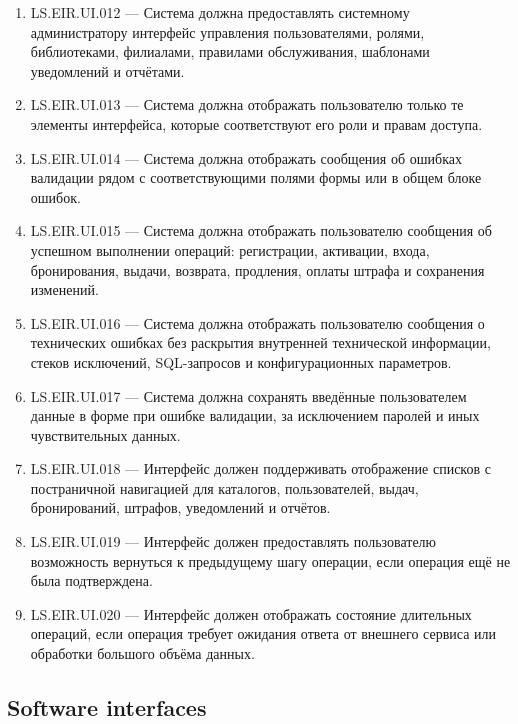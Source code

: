 \documentclass[12pt,a4paper]{article}
\begin{document}
\begin{enumerate}
		\item LS.EIR.UI.012 --- Система должна предоставлять системному администратору
		интерфейс управления пользователями, ролями, библиотеками, филиалами, правилами
		обслуживания, шаблонами уведомлений и отчётами.
		
		\item LS.EIR.UI.013 --- Система должна отображать пользователю только те элементы
		интерфейса, которые соответствуют его роли и правам доступа.
		
		\item LS.EIR.UI.014 --- Система должна отображать сообщения об ошибках валидации
		рядом с соответствующими полями формы или в общем блоке ошибок.
		
		\item LS.EIR.UI.015 --- Система должна отображать пользователю сообщения об
		успешном выполнении операций: регистрации, активации, входа, бронирования,
		выдачи, возврата, продления, оплаты штрафа и сохранения изменений.
		
		\item LS.EIR.UI.016 --- Система должна отображать пользователю сообщения о
		технических ошибках без раскрытия внутренней технической информации, стеков
		исключений, SQL-запросов и конфигурационных параметров.
		
		\item LS.EIR.UI.017 --- Система должна сохранять введённые пользователем данные
		в форме при ошибке валидации, за исключением паролей и иных чувствительных
		данных.
		
		\item LS.EIR.UI.018 --- Интерфейс должен поддерживать отображение списков
		с постраничной навигацией для каталогов, пользователей, выдач, бронирований,
		штрафов, уведомлений и отчётов.
		
		\item LS.EIR.UI.019 --- Интерфейс должен предоставлять пользователю возможность
		вернуться к предыдущему шагу операции, если операция ещё не была подтверждена.
		
		\item LS.EIR.UI.020 --- Интерфейс должен отображать состояние длительных операций,
		если операция требует ожидания ответа от внешнего сервиса или обработки большого
		объёма данных.
	\end{enumerate}
	
	\subsection{Software interfaces}
	
\end{document}
